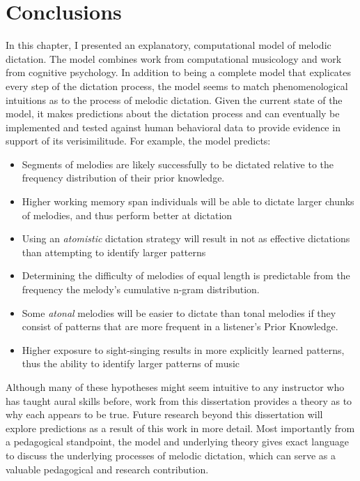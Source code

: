 \documentclass[12pt,]{book}
\providecommand{\tightlist}{%
  \setlength{\itemsep}{0pt}\setlength{\parskip}{0pt}}
\begin{document}
\hypertarget{conclusions-3}{%
\section{Conclusions}\label{conclusions-3}}

In this chapter, I presented an explanatory, computational model of melodic dictation.
The model combines work from computational musicology and work from cognitive psychology.
In addition to being a complete model that explicates every step of the dictation process, the model seems to match phenomenological intuitions as to the process of melodic dictation.
Given the current state of the model, it makes predictions about the dictation process and can eventually be implemented and tested against human behavioral data to provide evidence in support of its verisimilitude.
For example, the model predicts:

\begin{itemize}
\tightlist
\item
  Segments of melodies are likely successfully to be dictated relative to the frequency distribution of their prior knowledge.
\item
  Higher working memory span individuals will be able to dictate larger chunks of melodies, and thus perform better at dictation
\item
  Using an \emph{atomistic} dictation strategy will result in not as effective dictations than attempting to identify larger patterns
\item
  Determining the difficulty of melodies of equal length is predictable from the frequency the melody's cumulative n-gram distribution.
\item
  Some \emph{atonal} melodies will be easier to dictate than tonal melodies if they consist of patterns that are more frequent in a listener's Prior Knowledge.
\item
  Higher exposure to sight-singing results in more explicitly learned patterns, thus the ability to identify larger patterns of music
\end{itemize}

Although many of these hypotheses might seem intuitive to any instructor who has taught aural skills before, work from this dissertation provides a theory as to why each appears to be true.
Future research beyond this dissertation will explore predictions as a result of this work in more detail.
Most importantly from a pedagogical standpoint, the model and underlying theory gives exact language to discuss the underlying processes of melodic dictation, which can serve as a valuable pedagogical and research contribution.


\end{document}
